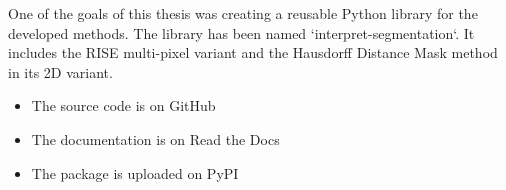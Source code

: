 One of the goals of this thesis was creating a reusable Python library for the developed methods.
The library has been named `interpret-segmentation`. It includes the RISE multi-pixel variant and the Hausdorff Distance Mask method
in its 2D variant.

\begin{itemize}
    \item The source code is on GitHub \cite{library_github}
    \item The documentation is on Read the Docs \cite{library_rtd}
    \item The package is uploaded on PyPI 
\end{itemize}